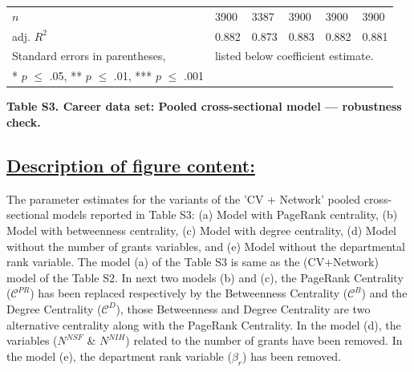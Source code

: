 \documentclass{article}\usepackage[]{graphicx}\usepackage[]{color}
\begin{document}
\begin{table}[h!]
\begin{center}
{\begin{tabular}{l l l l l l}
    \hline
    
    \rowcolor{gray!33} 
    $\textit{n}$
    & 3900 & 3387 & 3900 & 3900 & 3900 \\
    
    \rowcolor{gray!33} 
    adj. ${R^2}$ 
    & 0.882 & 0.873 & 0.883 & 0.882 & 0.881 \\
    
    \hline
    \hline
    
    Standard errors in parentheses, & \multicolumn{5}{l}{listed below coefficient estimate.} \\
    {* $\textit{p}$ $\leq$ .05, ** $\textit{p}$ $\leq$ .01, *** $\textit{p}$ $\leq$ .001}
    
  \end{tabular}%
  }
  \end{center}
\end{table}
\begin{center}
\par{\textbf{Table S3. Career data set: Pooled cross-sectional model --- robustness check.}}
\end{center}
\newpage
\subsection*{\underline{Description of figure content:}}
\par{
The parameter estimates for the variants of the 'CV + Network' pooled cross-sectional models reported in Table S3: (a) Model with PageRank centrality, (b) Model with betweenness centrality, (c) Model with degree centrality, (d) Model without the number of grants variables, and (e) Model without the departmental rank variable. The model (a) of the Table S3 is same as the (CV+Network) model of the Table S2. In next two models (b) and (c), the PageRank Centrality ($\mathscr{C}^{PR}$) has been replaced respectively by the Betweenness Centrality ($\mathscr{C}^{B}$) and the Degree Centrality ($\mathscr{C}^{D}$), those Betweenness and Degree Centrality are two alternative centrality along with the PageRank Centrality. In the model (d), the variables (${N^{NSF}}$ \& ${N^{NIH}}$) related to the number of grants have been removed. In the model (e), the department rank variable ($\beta_{r}$) has been removed. 
}
\end{document}

